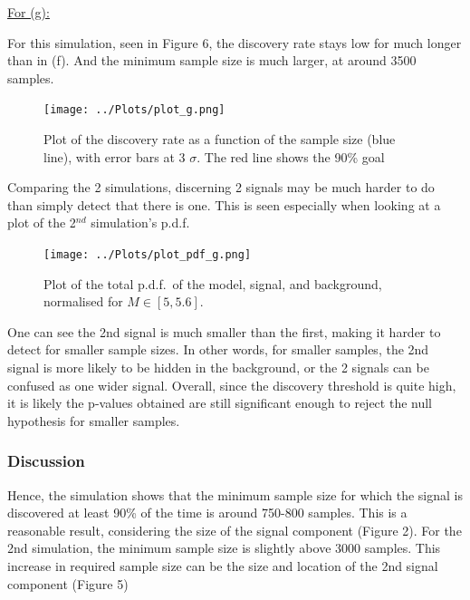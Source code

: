 \documentclass[12pt]{report} %
\begin{document}
\vspace*{1\baselineskip}

\underline{For (g):}

\vspace*{1\baselineskip}
For this simulation, seen in Figure 6, the discovery rate stays low for much longer than in (f). And the minimum sample size is much larger, at around 3500 samples.

\begin{figure}[htb]
    \centering
    \texttt{[image: ../Plots/plot\_g.png]}
    \captionsetup{margin=1.3cm}
    \caption[width=0.2\pdfpagewidth]{Plot of the discovery rate as a function of the sample size (blue line), with error bars at 3 $\sigma$. The red line shows the 90\% goal}
\end{figure}

\newpage
Comparing the 2 simulations, discerning 2 signals may be much harder to do than simply detect that there is one. This is seen especially when looking at a plot of the 2$^{nd}$ simulation's p.d.f.

\begin{figure}[htb]
    \centering
    \texttt{[image: ../Plots/plot\_pdf\_g.png]}
    \captionsetup{margin=1.3cm}
    \caption[width=0.2\pdfpagewidth]{Plot of the total p.d.f.\ of the model, signal, and background, normalised for $M\in{[5,5.6]}$.}
\end{figure}

One can see the 2nd signal is much smaller than the first, making it harder to detect for smaller sample sizes. In other words, for smaller samples, the 2nd signal is more likely to be hidden in the background, or the 2 signals can be confused as one wider signal. Overall, since the discovery threshold is quite high, it is likely the p-values obtained are still significant enough to reject the null hypothesis for smaller samples. 
\newpage
\subsubsection*{Discussion}
Hence, the simulation shows that the minimum sample size for which the signal is discovered at least 90\% of the time is around 750-800 samples. This is a reasonable result, considering the size of the signal component (Figure 2). For the 2nd simulation, the minimum sample size is slightly above 3000 samples. This increase in required sample size can be the size and location of the 2nd signal component (Figure 5)




\end{document}
